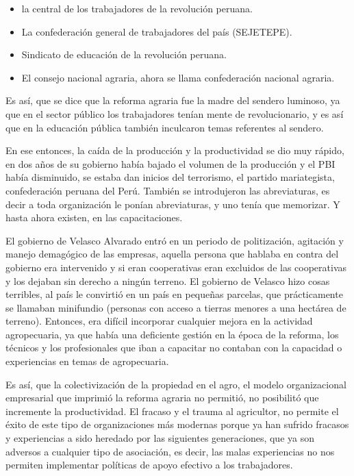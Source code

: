 \documentclass[
  a4paper,
]{article}
\providecommand{\tightlist}{%
  \setlength{\itemsep}{0pt}\setlength{\parskip}{0pt}}\usepackage{longtable,booktabs,array}
\begin{document}
\begin{itemize}
\tightlist
\item
  la central de los trabajadores de la revolución peruana.
\item
  La confederación general de trabajadores del país (SEJETEPE).
\item
  Sindicato de educación de la revolución peruana.
\item
  El consejo nacional agraria, ahora se llama confederación nacional
  agraria.
\end{itemize}

Es así, que se dice que la reforma agraria fue la madre del sendero
luminoso, ya que en el sector público los trabajadores tenían mente de
revolucionario, y es así que en la educación pública también inculcaron
temas referentes al sendero.

En ese entonces, la caída de la producción y la productividad se dio muy
rápido, en dos años de su gobierno había bajado el volumen de la
producción y el PBI había disminuido, se estaba dan inicios del
terrorismo, el partido mariategista, confederación peruana del Perú.
También se introdujeron las abreviaturas, es decir a toda organización
le ponían abreviaturas, y uno tenía que memorizar. Y hasta ahora
existen, en las capacitaciones.

El gobierno de Velasco Alvarado entró en un periodo de politización,
agitación y manejo demagógico de las empresas, aquella persona que
hablaba en contra del gobierno era intervenido y si eran cooperativas
eran excluidos de las cooperativas y los dejaban sin derecho a ningún
terreno. El gobierno de Velasco hizo cosas terribles, al país le
convirtió en un país en pequeñas parcelas, que prácticamente se llamaban
minifundio (personas con acceso a tierras menores a una hectárea de
terreno). Entonces, era difícil incorporar cualquier mejora en la
actividad agropecuaria, ya que había una deficiente gestión en la época
de la reforma, los técnicos y los profesionales que iban a capacitar no
contaban con la capacidad o experiencias en temas de agropecuaria.

Es así, que la colectivización de la propiedad en el agro, el modelo
organizacional empresarial que imprimió la reforma agraria no permitió,
no posibilitó que incremente la productividad. El fracaso y el trauma al
agricultor, no permite el éxito de este tipo de organizaciones más
modernas porque ya han sufrido fracasos y experiencias a sido heredado
por las siguientes generaciones, que ya son adversos a cualquier tipo de
asociación, es decir, las malas experiencias no nos permiten implementar
políticas de apoyo efectivo a los trabajadores.
\end{document}
